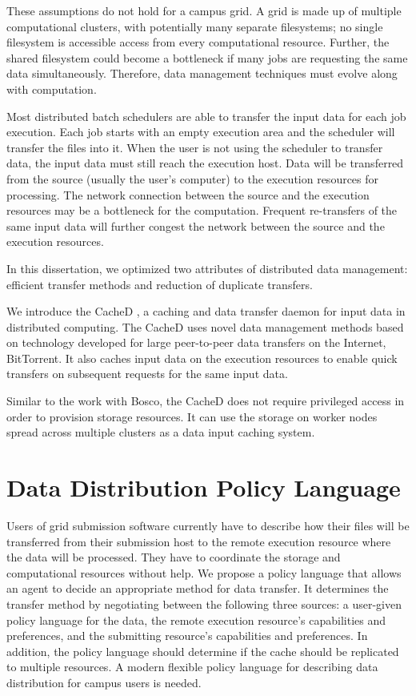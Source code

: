 These assumptions do not hold for a campus grid.  A grid is made up of multiple computational clusters, with potentially many separate filesystems; no single filesystem is accessible access from every computational resource.  Further, the shared filesystem could become a bottleneck if many jobs are requesting the same data simultaneously.  Therefore, data management techniques must evolve along with computation.  


Most distributed batch schedulers are able to transfer the input data for each job execution.  Each job starts with an empty execution area and the scheduler will transfer the files into it.  When the user is not using the scheduler to transfer data, the input data must still reach the execution host.  Data will be transferred from the source (usually the user's computer) to the execution resources for processing.  The network connection between the source and the execution resources may be a bottleneck for the computation.  Frequent re-transfers of the same input data will further congest the network between the source and the execution resources.

In this dissertation, we optimized two attributes of distributed data management: efficient transfer methods and reduction of duplicate transfers.

We introduce the CacheD \cite{weitzel2015pdpta}, a caching and data transfer daemon for input data in distributed computing.  The CacheD uses novel data management methods based on technology developed for large peer-to-peer data transfers on the Internet, BitTorrent.  It also caches input data on the execution resources to enable quick transfers on subsequent requests for the same input data.

Similar to the work with Bosco, the CacheD does not require privileged access in order to provision storage resources.  It can use the storage on worker nodes spread across multiple clusters as a data input caching system.

\section{Data Distribution Policy Language}

Users of grid submission software currently have to describe how their files will be transferred from their submission host to the remote execution resource where the data will be processed.  They have to coordinate the storage and computational resources without help.  We propose a policy language that allows an agent to decide an appropriate method for data transfer.  It determines the transfer method by negotiating between the following three sources: a user-given policy language for the data, the remote execution resource's capabilities and preferences, and the submitting resource's capabilities and preferences.  In addition, the policy language should determine if the cache should be replicated to multiple resources.  A modern flexible policy language for describing data distribution for campus users is needed.

